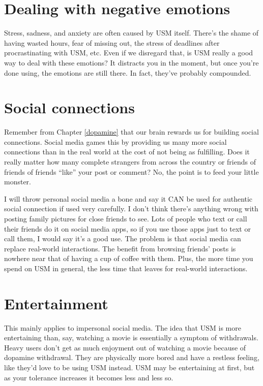 \documentclass[
  openany]{book}
\begin{document}
\section{Dealing with negative emotions}\label{dealing-with-negative-emotions}

Stress, sadness, and anxiety are often caused by USM itself. There's the shame of having wasted hours, fear of missing out, the stress of deadlines after procrastinating with USM, etc. Even if we disregard that, is USM really a good way to deal with these emotions? It distracts you in the moment, but once you're done using, the emotions are still there. In fact, they've probably compounded.

\section{Social connections}\label{social-connections}

Remember from Chapter \ref{dopamine} that our brain rewards us for building social connections. Social media games this by providing us many more social connections than in the real world at the cost of not being as fulfilling. Does it really matter how many complete strangers from across the country or friends of friends of friends ``like'' your post or comment? No, the point is to feed your little monster.

I will throw personal social media a bone and say it CAN be used for authentic social connection if used very carefully. I don't think there's anything wrong with posting family pictures for close friends to see. Lots of people who text or call their friends do it on social media apps, so if you use those apps just to text or call them, I would say it's a good use. The problem is that social media can replace real-world interactions. The benefit from browsing friends' posts is nowhere near that of having a cup of coffee with them. Plus, the more time you spend on USM in general, the less time that leaves for real-world interactions.

\section{Entertainment}\label{entertainment}

This mainly applies to impersonal social media. The idea that USM is more entertaining than, say, watching a movie is essentially a symptom of withdrawals. Heavy users don't get as much enjoyment out of watching a movie because of dopamine withdrawal. They are physically more bored and have a restless feeling, like they'd love to be using USM instead. USM may be entertaining at first, but as your tolerance increases it becomes less and less so.
\end{document}
